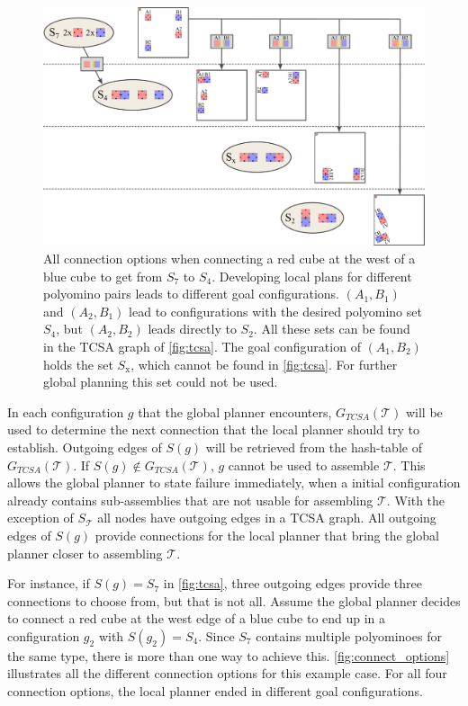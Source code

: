 \begin{figure}
	\centering
	\includegraphics[width=1\textwidth]{figures/connect_options.pdf}
	\caption[Example of connection options for one two-cut-sub-assembly edge]{All connection options when connecting a red cube at the west of a blue cube to get from $S_7$ to $S_4$. Developing local plans for different polyomino pairs leads to different goal configurations. $(A_1,B_1)$ and $(A_2,B_1)$ lead to configurations with the desired polyomino set $S_4$, but $(A_2,B_2)$ leads directly to $S_2$. All these sets can be found in the TCSA graph of \autoref{fig:tcsa}. The goal configuration of $(A_1, B_2)$ holds the set $S_\text{x}$, which cannot be found in \autoref{fig:tcsa}. For further global planning this set could not be used.}
	\label{fig:connect_options}
\end{figure}

In each configuration $g$ that the global planner encounters, $G_{\textit{TCSA}}(\mathcal{T})$ will be used to determine the next connection that the local planner should try to establish.
Outgoing edges of $S(g)$ will be retrieved from the hash-table of $G_{\textit{TCSA}}(\mathcal{T})$.
If $S(g) \notin G_{\textit{TCSA}}(\mathcal{T})$, $g$ cannot be used to assemble $\mathcal{T}$.
This allows the global planner to state failure immediately, when a initial configuration already contains sub-assemblies that are not usable for assembling $\mathcal{T}$.
With the exception of $S_\mathcal{T}$ all nodes have outgoing edges in a TCSA graph.
All outgoing edges of $S(g)$ provide connections for the local planner that bring the global planner closer to assembling $\mathcal{T}$.

For instance, if $S(g) = S_7$ in \autoref{fig:tcsa}, three outgoing edges provide three connections to choose from, but that is not all.
Assume the global planner decides to connect a red cube at the west edge of a blue cube to end up in a configuration $g_2$ with $S(g_2) = S_4$.
Since $S_7$ contains multiple polyominoes for the same type, there is more than one way to achieve this.
\autoref{fig:connect_options} illustrates all the different connection options for this example case.
For all four connection options, the local planner ended in different goal configurations.

